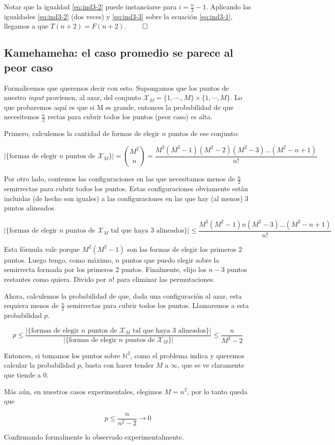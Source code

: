   Notar que la igualdad \ref{eq:ind3-2} puede instanciarse para $i = \frac{n}{2}-1$. 
  Aplicando las igualdades \ref{eq:ind3-2} (dos veces) y \ref{eq:ind3-3} sobre la ecuación \ref{eq:ind3-1}, llegamos a que $T(n + 2) = F(n + 2)$. $\qed$


\subsection{Kamehameha: el caso promedio se parece al peor caso}

Formalicemos que queremos decir con esto. Supongamos que los puntos de nuestro \emph{input} provienen, al azar, del conjunto $\mathcal{X}_M = \{1, \cdots., M\} \times \{1, \cdots, M\}$. Lo que probaremos aquí es que si M es grande, entonces la probabilidad de que necesitemos $\frac{n}{2}$ rectas para cubrir todos los puntos (peor caso) es alta.

Primero, calculemos la cantidad de formas de elegir $n$ puntos de ese conjunto:

\[|\{\text{formas de elegir $n$ puntos de $\mathcal{X}_M$} \}| = \binom{M^2}{n} = \frac{M^2 (M^2 - 1) (M^2 - 2) (M^2 - 3) \dots (M^2 - n + 1)}{n!}\]

Por otro lado, contemos las configuraciones en las que necesitamos menos de $\frac{n}2$ semirrectas para cubrir todos los puntos. Estas configuraciones obviamente están incluidas (de hecho son iguales) a las configuraciones en las que hay (al menos) 3 puntos alineados.

\[|\{\text{formas de elegir $n$ puntos de $\mathcal{X}_M$ tal que haya 3 alineados}\}| \leq \frac{M^2 (M^2 - 1) n (M^2 - 3) \dots (M^2 - n + 1)}{n!}\]

Esta fórmula vale porque $M^2 (M^2 - 1)$ son las formas de elegir los primeros 2 puntos. Luego tengo, como máximo, $n$ puntos que puedo elegir sobre la semirrecta formada por los primeros 2 puntos. Finalmente, elijo los $n - 3$ puntos restantes como quiera. Divido por $n!$ para eliminar las permutaciones.

Ahora, calculemos la probabilidad de que, dada una configuración al azar, esta requiera menos de $\frac{n}2$ semirrectas para cubrir todos los puntos. Llamaremos a esta probabilidad $p$.

\[p \leq \frac{|\{\text{formas de elegir $n$ puntos de $\mathcal{X}_M$ tal que haya 3 alineados} \}|}{|\{\text{formas de elegir $n$ puntos de $\mathcal{X}_M$} \}|} \leq \frac{n} {M^2 - 2}\]


Entonces, si tomamos los puntos sobre $\mathbb{N}^2$, como el problema indica y queremos calcular la probabilidad $p$, basta con hacer tender $M$ a $\infty$, que se ve claramente que tiende a 0.

Más aún, en nuestros casos experimentales, elegimos $M = n^2$, por lo tanto queda que

\[p \leq \frac{n} {n^2 - 2} \to 0\]

Confirmando formalmente lo observado experimentalmente.


